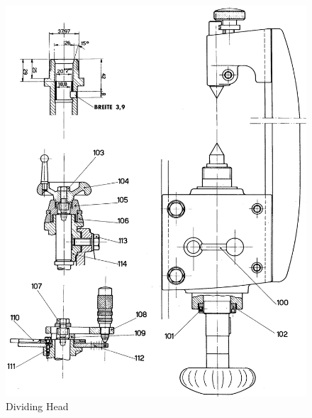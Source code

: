 \newpage
\begin{figure}[h]
    \centering
    \includegraphics[width=1.0\linewidth]{./images/page_45}
    \caption{Dividing Head}
    \label{fig:dividing_head}
\end{figure}
